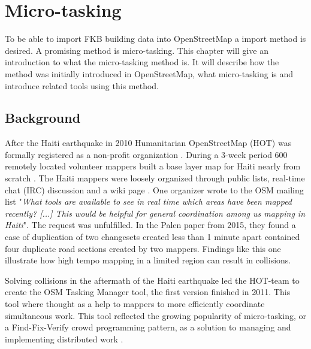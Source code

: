
\chapter{Micro-tasking}
To be able to import FKB building data into OpenStreetMap a import method is desired. A promising method is micro-tasking. This chapter will give an introduction to what the micro-tasking method is. It will describe how the method was initially introduced in OpenStreetMap, what micro-tasking is and introduce related tools using this method. 

\section{Background}
After the Haiti earthquake in 2010 Humanitarian OpenStreetMap (HOT) was formally registered as a non-profit organization \cite{Soden}. During a 3-week period 600 remotely located volunteer mappers built a base layer map for Haiti nearly from scratch \cite{Soden}. The Haiti mappers were loosely organized through public lists, real-time chat (IRC) discussion and a wiki page \cite{Palen2015}. One organizer wrote to the OSM mailing list "\textit{What tools are available to see in real time which areas have been mapped recently? [...] This would be helpful for general coordination among us mapping in Haiti}". The request was unfulfilled. In the Palen paper from 2015, they found a case of duplication of two changesets created less than 1 minute apart contained four duplicate road sections created by two mappers. Findings like this one illustrate how high tempo mapping in a limited region can result in collisions. 

Solving collisions in the aftermath of the Haiti earthquake led the HOT-team to create the OSM Tasking Manager tool, the first version finished in 2011. This tool where thought as a help to mappers to more efficiently coordinate simultaneous work. This tool reflected the growing popularity of micro-tasking, or a Find-Fix-Verify crowd programming pattern, as a solution to managing and implementing distributed work \cite{Bernstein2015}.  

